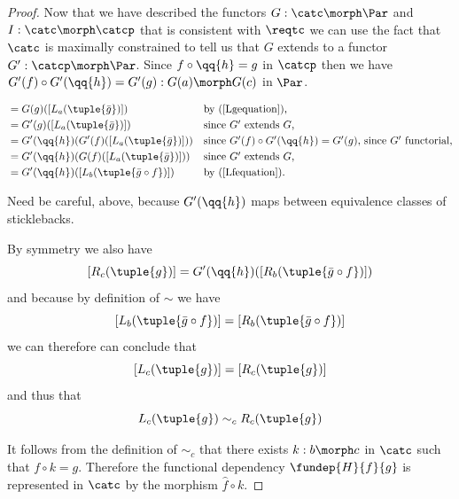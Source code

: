 \begin{proof}
Now that we have described the functors  $G: \catc \morph \Par$ and $I:\catc \morph \catcp$ that is consistent with $\reqtc$
we can use the fact that $\catc$ is maximally constrained to tell us that $G$ extends to a functor 
$G' : \catcp \morph \Par$. Since $f \circ \qq{h} = g$ in $\catcp$ then we have
 $G'(f) \circ G'(\qq{h}) = G'(g): G(a) \morph G(c)$ in $\Par$.

\begin{align*}
[L_c(g)] 
        &= G(g)([L_a(\tuple{\bar{g}})])       
                && \mbox{by (\ref{Lgequation}),}\\
        &= G'(g)([L_a(\tuple{\bar{g}})])      
                && \mbox{since $G'$ extends $G$,} \\
        &= G'(\qq{h}) (G'(f)([L_a(\tuple{\bar{g}})])) 
                && \mbox{since $G'(f) \circ G'(\qq{h}) = G'(g)$, since $G'$ functorial,}\\
        &= G'(\qq{h}) (G(f)([L_a(\tuple{\bar{g}})])) 
                && \mbox{since $G'$ extends $G$,}  \\
	      &= G'(\qq{h}) ([L_b(\tuple{\bar{g} \circ f})])       
                &&\mbox{by (\ref{Lfequation}).} 
\end{align*}
\begin{commentary} 
Need be careful, above, because $G'(\qq{h})$ 
maps between equivalence classes of sticklebacks.
\end{commentary}
By symmetry we also have
$$[R_c(\tuple{g})] = G'(\qq{h}) ([R_b(\tuple{\bar{g} \circ f})])  $$
and because by definition of $\sim$ we have
$$[L_b(\tuple{\bar{g} \circ f})]=[R_b(\tuple{\bar{g} \circ f})]$$
we can therefore can conclude that
$$[L_c(\tuple{g})] = [R_c(\tuple{g})]$$
and thus that
$$ L_c(\tuple{g}) \sim_c R_c(\tuple{g})$$


It follows from the definition of $\sim_c$ that there exists $k:b \morph c$ in 
$\catc$ such that 
$f \circ k = g$.  
Therefore the functional dependency $\fundep{H}{f}{g}$ 
is represented in $\catc$ 
by the morphism $\widehat{f} \circ k$.
\end{proof}


